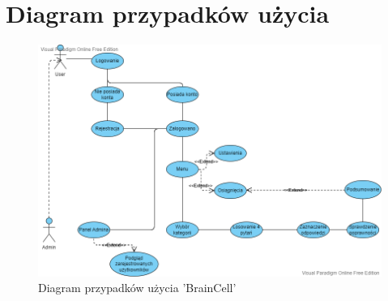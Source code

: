     \newpage
\section{Diagram przypadków użycia}		%

\begin{figure}[!htb]
	\begin{center}
		\includegraphics[width=15cm]{rys/przypadki uzycia.png}
		\caption{Diagram przypadków użycia 'BrainCell'}
		\label{rys:rysunek001}
	\end{center}
\end{figure} 